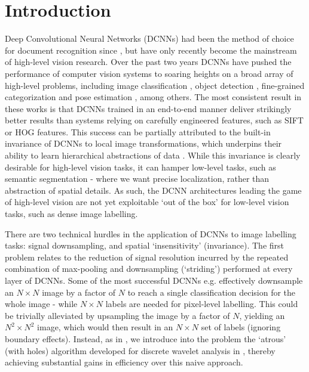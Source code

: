 \section{Introduction}
\label{sec:intro}
Deep Convolutional Neural Networks (DCNNs) had been the method of choice for document recognition since  \citet{LeCun1998}, but 
have only recently become the mainstream of high-level vision research.
Over the past two years  DCNNs have pushed the performance of computer vision systems to soaring heights on a broad array of high-level problems, including image classification \citet{KrizhevskyNIPS2013, papandreou2014untangling, sermanet2013overfeat, simonyan2014very, szegedy2014going}, object detection \citet{girshick2014rcnn}, fine-grained categorization \citet{zhang2014part} and pose estimation \citet{chen2014articulated, tompson2014joint}, among others.
The most consistent result in these works is that DCNNs trained in an end-to-end manner  deliver  strikingly better results than systems relying on carefully engineered features, such as SIFT or HOG features.
This success can be partially attributed to the built-in  invariance of DCNNs to local image transformations, which underpins their ability to learn hierarchical abstractions of data \citep{zeiler2014visualizing}. While this invariance is clearly desirable for high-level vision tasks, it can hamper low-level tasks, such as semantic segmentation - where we want precise localization, rather than abstraction of spatial details.  As such, the DCNN architectures leading the game of high-level vision are not yet exploitable `out of the box' for low-level vision tasks, such as dense image labelling. 



There are two technical hurdles in the application of DCNNs to image labelling tasks: signal downsampling, and spatial `insensitivity' (invariance). 
The first problem relates to the reduction of signal resolution incurred by the repeated combination of max-pooling and downsampling (`striding') performed at every layer of DCNNs.  Some of the most successful  DCNNs e.g. 
\citep{KrizhevskyNIPS2013, simonyan2014very, szegedy2014going}
effectively downsample an $N\times N$ image by a factor of $N$ to reach 
a single  classification decision for the whole image - while $N \times N$ labels are needed for pixel-level labelling. This could  be trivially alleviated by upsampling the image by a factor of $N$, yielding an $N^2\times N^2$ image, which would then result in an $N\times N$ set of labels (ignoring boundary effects). Instead, as in  \cite{papandreou2014untangling}, we introduce into the problem the `atrous' (with holes) algorithm developed for  discrete wavelet analysis in  \cite{Mall99}, thereby achieving substantial gains in efficiency over this naive approach. 

